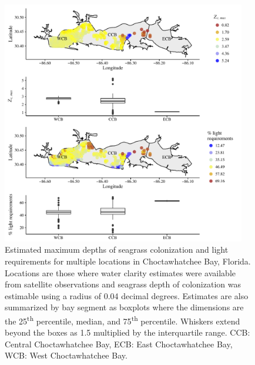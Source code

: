 \documentclass[letterpaper,12pt,oneside]{article}\usepackage[]{graphicx}\usepackage[]{color}
\begin{document}
\begin{figure}
\centering
\includegraphics[width = 0.95\textwidth]{figs/FigS1.pdf}
\caption{Estimated maximum depths of seagrass colonization and light requirements for multiple locations in Choctawhatchee Bay, Florida. Locations are those where water clarity estimates were available from satellite observations and seagrass depth of colonization was estimable using a radius of 0.04 decimal degrees.  Estimates are also summarized by bay segment as boxplots where the dimensions are the 25\textsuperscript{th} percentile, median, and 75\textsuperscript{th} percentile.  Whiskers extend beyond the boxes as 1.5 multiplied by the interquartile range. CCB: Central Choctawhatchee Bay, ECB: East Choctawhatchee Bay, WCB: West Choctawhatchee Bay.}
\label{fig:light_choc_zcmax}
\end{figure}

\end{document}

